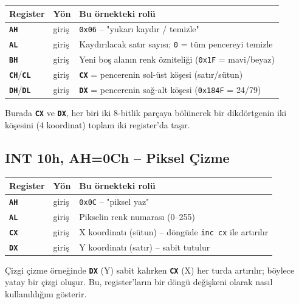 \documentclass[11pt,a4paper]{article}
\newcommand{\reg}[1]{\texttt{\color{anaMavi}\textbf{#1}}}
\newcommand{\hx}[1]{\texttt{\color{turuncu}#1}}
\newcommand{\kod}[1]{\texttt{\color{koyuGri}#1}}
\begin{document}
\begin{center}
\begin{tabularx}{\textwidth}{@{}l l >{\raggedright\arraybackslash}X@{}}
\toprule
\rowcolor{anaMavi}\color{white}\textbf{Register} & \color{white}\textbf{Yön} & \color{white}\textbf{Bu örnekteki rolü} \\
\midrule
\reg{AH} & giriş & \hx{0x06} -- "yukarı kaydır / temizle" \\
\rowcolor{acikGri} \reg{AL} & giriş & Kaydırılacak satır sayısı; \hx{0} = tüm pencereyi temizle \\
\reg{BH} & giriş & Yeni boş alanın renk özniteliği (\hx{0x1F} = mavi/beyaz) \\
\rowcolor{acikGri} \reg{CH}/\reg{CL} & giriş & \reg{CX} = pencerenin sol-üst köşesi (satır/sütun) \\
\reg{DH}/\reg{DL} & giriş & \reg{DX} = pencerenin sağ-alt köşesi (\hx{0x184F} = 24/79) \\
\bottomrule
\end{tabularx}
\end{center}
Burada \reg{CX} ve \reg{DX}, her biri iki 8-bitlik parçaya bölünerek bir
dikdörtgenin iki köşesini (4 koordinat) toplam iki register'da taşır.

\subsection{INT 10h, AH=0Ch -- Piksel Çizme}

\begin{center}
\begin{tabularx}{\textwidth}{@{}l l >{\raggedright\arraybackslash}X@{}}
\toprule
\rowcolor{anaMavi}\color{white}\textbf{Register} & \color{white}\textbf{Yön} & \color{white}\textbf{Bu örnekteki rolü} \\
\midrule
\reg{AH} & giriş & \hx{0x0C} -- "piksel yaz" \\
\rowcolor{acikGri} \reg{AL} & giriş & Pikselin renk numarası (0--255) \\
\reg{CX} & giriş & X koordinatı (sütun) -- döngüde \kod{inc cx} ile artırılır \\
\rowcolor{acikGri} \reg{DX} & giriş & Y koordinatı (satır) -- sabit tutulur \\
\bottomrule
\end{tabularx}
\end{center}
Çizgi çizme örneğinde \reg{DX} (Y) sabit kalırken \reg{CX} (X) her turda
artırılır; böylece yatay bir çizgi oluşur. Bu, register'ların bir döngü
değişkeni olarak nasıl kullanıldığını gösterir.
\end{document}
